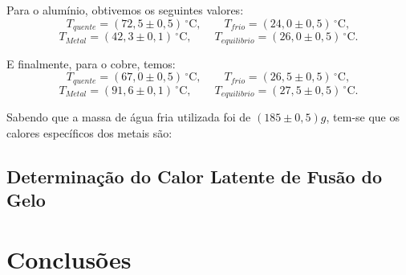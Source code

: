 \documentclass[12pt,a4paper]{article}
\begin{document}
Para o alumínio, obtivemos os seguintes valores:
$$ T_{quente} = (72,5 \pm 0,5)\,^{\circ}\mathrm{C}, \qquad T_{frio} = (24,0 \pm 0,5)\,^{\circ}\mathrm{C}, $$
$$ T_{Metal} = (42,3 \pm 0,1)\,^{\circ}\mathrm{C}, \qquad T_{equilibrio} = (26,0 \pm 0,5)\,^{\circ}\mathrm{C}. $$


 E finalmente, para o cobre, temos:
$$ T_{quente} = (67,0 \pm 0,5)\,^{\circ}\mathrm{C}, \qquad T_{frio} = (26,5 \pm 0,5)\,^{\circ}\mathrm{C}, $$
$$ T_{Metal} = (91,6 \pm 0,1)\,^{\circ}\mathrm{C}, \qquad T_{equilibrio} = (27,5 \pm 0,5)\,^{\circ}\mathrm{C}. $$

Sabendo que a massa de água fria utilizada foi de $(185 \pm 0,5)g$, tem-se que os calores específicos dos metais são:

\subsection{Determinação do Calor Latente de Fusão do Gelo}


\section{Conclusões}
\end{document}
